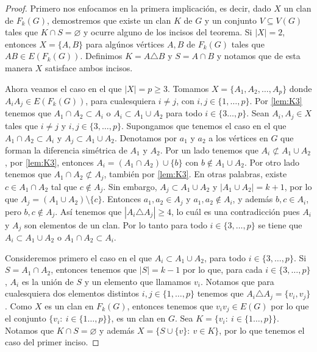     \begin{proof}
        Primero nos enfocamos en la primera implicaci\'on, es decir, dado $X$ un
        clan de $F_k(G)$, demostremos que existe un clan $K$ de $G$ y un
        conjunto $V \subseteq V(G)$ tales que $K \cap S = \varnothing$ y ocurre
        alguno de los incisos del teorema. Si $|X|=2$, entonces $X= \{A, B\}$
        para alg\'unos v\'ertices $A, B$ de $F_k(G)$ tales que $AB \in
        E(F_k(G))$. Definimos $K = A \triangle B$ y $S=A \cap B$ y notamos que
        de esta manera $X$ satisface ambos incisos.

        Ahora veamos el caso en el que $|X|= p \geq 3$. Tomamos $X=\{A_1, A_2,
        \dots, A_p\}$ donde $A_i{A_j} \in E(F_k(G))$, para cualesquiera $i\neq
        j$, con $i,j \in \{1, \dots, p\}$. Por \cref{lem:K3} tenemos que
        $A_1\cap A_2 \subset A_i$ o $A_i \subset A_1 \cup A_2$ para todo $i \in
        \{3 \dots,p \}$. Sean $A_i, A_j \in X$ tales que $i \neq j$ y $i, j \in
        \{3, \dots, p\}$. Supongamos que tenemos el caso en el que $A_1\cap A_2
        \subset A_i$ y $A_j \subset A_1 \cup A_2$. Denotamos por $a_1$ y $a_2$ a
        los v\'ertices en $G$ que forman la diferencia sim\'etrica de $A_1$ y
        $A_2$. Por un lado tenemos que $A_i \not\subset A_1\cup A_2$, por
        \cref{lem:K3}, entonces $A_i = (A_1\cap A_2) \cup \{b\}$ con $b \notin
        A_1\cup A_2$. Por otro lado tenemos que $A_1 \cap A_2 \not\subset A_j$,
        tambi\'en por \cref{lem:K3}. En otras palabras, existe $c \in A_1 \cap
        A_2$ tal que $c \notin A_j$. Sin embargo, $A_j \subset A_1 \cup A_2$ y
        $|A_1 \cup A_2| =k+1$, por lo que $A_j = (A_1 \cup A_2)\setminus \{c\}$.
        Entonces $a_1, a_2 \in A_j$ y $a_1, a_2 \notin A_i$, y adem\'as $b, c
        \in A_i$, pero $b, c \notin A_j$. As\'i tenemos que $|A_i \triangle A_j|
        \geq 4$, lo cu\'al es una contradicci\'on pues $A_i$ y $A_j$ son
        elementos de un clan. Por lo tanto para todo $i\in \{3, \dots, p\}$ se
        tiene que $A_i \subset A_1\cup A_2$ o $A_1 \cap A_2 \subset A_i$.

        Consideremos primero el caso en el que $A_i \subset A_1\cup A_2$, para
        todo $i\in \{3, \dots, p\}$. Si $S= A_1 \cap A_2$, entonces tenemos que
        $|S| =k-1$ por lo que, para cada $i \in \{3, \dots, p\}$, $A_i$ es la
        uni\'on de $S$ y un elemento que llamamos $v_i$. Notamos que para
        cualesquiera dos elementos distintos $i, j \in \{1, \dots, p\}$ tenemos
        que $A_i \triangle A_j = \{v_i, v_j\}$. Como $X$ es un clan en $F_k(G)$,
        entonces tenemos que $v_i{v_j} \in E(G)$ por lo que el conjunto
        $\{v_i\colon\ i \in \{1 \dots, p\}\}$, es un clan en $G$.   Sea $K =
        \{v_i\colon\ i \in \{1 \dots, p\}\}$.  Notamos que  $K \cap S =
        \varnothing$ y adem\'as $X= \{S \cup \{v\}\colon\ v \in K\}$, por lo que
        tenemos el caso del primer inciso.


\end{proof}
